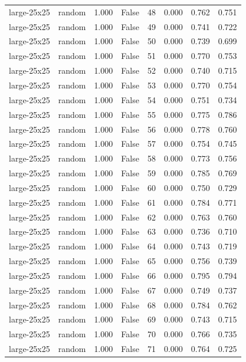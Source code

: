 \begin{tabular}{llrrrrrr}
large-25x25 & random & 1.000 & False & 48 & 0.000 & 0.762 & 0.751 \\
large-25x25 & random & 1.000 & False & 49 & 0.000 & 0.741 & 0.722 \\
large-25x25 & random & 1.000 & False & 50 & 0.000 & 0.739 & 0.699 \\
large-25x25 & random & 1.000 & False & 51 & 0.000 & 0.770 & 0.753 \\
large-25x25 & random & 1.000 & False & 52 & 0.000 & 0.740 & 0.715 \\
large-25x25 & random & 1.000 & False & 53 & 0.000 & 0.770 & 0.754 \\
large-25x25 & random & 1.000 & False & 54 & 0.000 & 0.751 & 0.734 \\
large-25x25 & random & 1.000 & False & 55 & 0.000 & 0.775 & 0.786 \\
large-25x25 & random & 1.000 & False & 56 & 0.000 & 0.778 & 0.760 \\
large-25x25 & random & 1.000 & False & 57 & 0.000 & 0.754 & 0.745 \\
large-25x25 & random & 1.000 & False & 58 & 0.000 & 0.773 & 0.756 \\
large-25x25 & random & 1.000 & False & 59 & 0.000 & 0.785 & 0.769 \\
large-25x25 & random & 1.000 & False & 60 & 0.000 & 0.750 & 0.729 \\
large-25x25 & random & 1.000 & False & 61 & 0.000 & 0.784 & 0.771 \\
large-25x25 & random & 1.000 & False & 62 & 0.000 & 0.763 & 0.760 \\
large-25x25 & random & 1.000 & False & 63 & 0.000 & 0.736 & 0.710 \\
large-25x25 & random & 1.000 & False & 64 & 0.000 & 0.743 & 0.719 \\
large-25x25 & random & 1.000 & False & 65 & 0.000 & 0.756 & 0.739 \\
large-25x25 & random & 1.000 & False & 66 & 0.000 & 0.795 & 0.794 \\
large-25x25 & random & 1.000 & False & 67 & 0.000 & 0.749 & 0.737 \\
large-25x25 & random & 1.000 & False & 68 & 0.000 & 0.784 & 0.762 \\
large-25x25 & random & 1.000 & False & 69 & 0.000 & 0.743 & 0.715 \\
large-25x25 & random & 1.000 & False & 70 & 0.000 & 0.766 & 0.735 \\
large-25x25 & random & 1.000 & False & 71 & 0.000 & 0.764 & 0.725 \\

\end{tabular}

